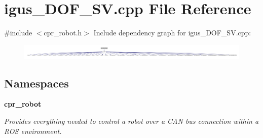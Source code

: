\section{igus\+\_\+D\+O\+F\+\_\+\+S\+V.\+cpp File Reference}
\label{igus__4DOF__SV_8cpp}
{\ttfamily \#include $<$cpr\+\_\+robot.\+h$>$}\newline
Include dependency graph for igus\+\_\+D\+O\+F\+\_\+\+S\+V.\+cpp\+:
\nopagebreak
\begin{figure}[H]
\begin{center}
\leavevmode
\includegraphics[width=350pt]{igus__4DOF__SV_8cpp__incl}
\end{center}
\end{figure}
\subsection*{Namespaces}
\begin{DoxyCompactItemize}
\item 
 \textbf{ cpr\+\_\+robot}
\begin{DoxyCompactList}\small\item\em Provides everything needed to control a robot over a C\+AN bus connection within a R\+OS environment. \end{DoxyCompactList}\end{DoxyCompactItemize}

